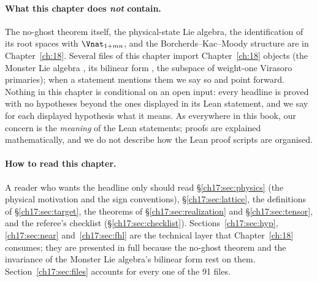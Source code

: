 \paragraph{What this chapter does \emph{not} contain.}  The no-ghost theorem itself, the physical-state
Lie algebra, the identification of its root spaces with $\Vnat_{1+mn}$, and the Borcherds--Kac--Moody
structure are in Chapter~\ref{ch:18}.  Several files of this chapter import Chapter~\ref{ch:18} objects
(the Monster Lie algebra , its bilinear form , the
subspace  of weight-one Virasoro primaries); when a statement mentions them we say
so and point forward.  Nothing in this chapter is conditional on an open input: every headline is proved
with no hypotheses beyond the ones displayed in its Lean statement, and we say for each displayed
hypothesis what it means.  As everywhere in this book, our concern is the \emph{meaning} of the Lean
statements; proofs are explained mathematically, and we do not describe how the Lean proof scripts are
organised.

\paragraph{How to read this chapter.}  A reader who wants the headline only should read
\S\ref{ch17:sec:physics} (the physical motivation and the sign conventions), \S\ref{ch17:sec:lattice},
the definitions of \S\ref{ch17:sec:target}, the theorems of \S\ref{ch17:sec:realization} and
\S\ref{ch17:sec:tensor}, and the referee's checklist (\S\ref{ch17:sec:checklist}).
Sections~\ref{ch17:sec:hyp}, \ref{ch17:sec:near} and~\ref{ch17:sec:fhl} are the technical layer that
Chapter~\ref{ch:18} consumes; they are presented in full because the no-ghost theorem and the invariance
of the Monster Lie algebra's bilinear form rest on them.  Section~\ref{ch17:sec:files} accounts for every
one of the 91 files.

